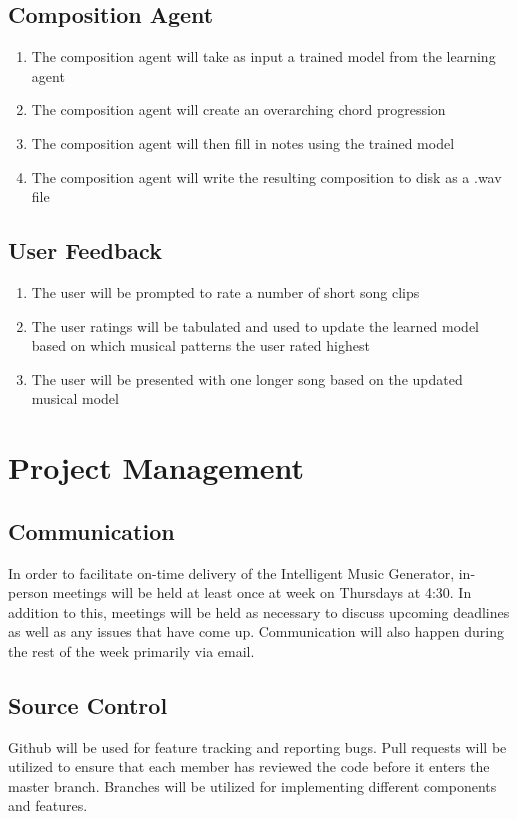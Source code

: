 \documentclass{article}
\begin{document}
\subsection{Composition Agent}
\begin{enumerate}
\item The composition agent will take as input a trained model from the learning agent
\item The composition agent will create an overarching chord progression
\item The composition agent will then fill in notes using the trained model
\item The composition agent will write the resulting composition to disk as a .wav file
\end{enumerate}

\subsection{User Feedback}
\begin{enumerate}
\item The user will be prompted to rate a number of short song clips
\item The user ratings will be tabulated and used to update the learned model based on which musical patterns the user rated highest
\item The user will be presented with one longer song based on the updated musical model
\end{enumerate}

\section{Project Management}
\subsection{Communication}
In order to facilitate on-time delivery of the Intelligent Music Generator, in-person meetings 
will be held at least once at week on Thursdays at 4:30. In addition to this, meetings will be 
held as necessary to discuss upcoming deadlines as well as any issues that have come up. 
Communication will also happen during the rest of the week primarily via email.

\subsection{Source Control}
Github will be used for feature tracking and reporting bugs.  Pull requests will be utilized to 
ensure that each member has reviewed the code before it enters the master branch.  Branches will 
be utilized for implementing different components and features.
\end{document}
